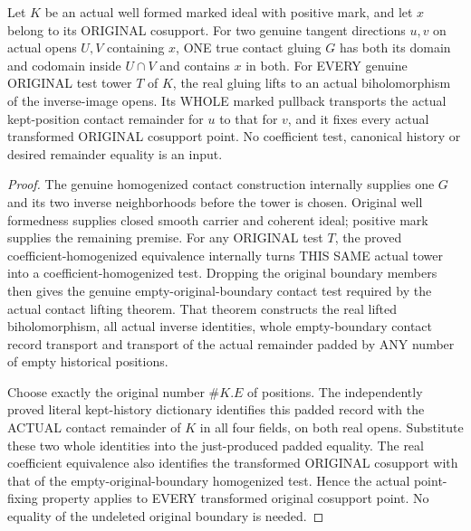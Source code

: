 \begin{theorem}
\label{hir:original-any-test-independent-contact-whole-remainder}
\leanok
Let $K$ be an actual well formed marked ideal with positive mark, and let
$x$ belong to its ORIGINAL cosupport. For two genuine tangent directions
$u,v$ on actual opens $U,V$ containing $x$, ONE true contact gluing $G$
has both its domain and codomain inside $U\cap V$ and contains $x$ in both.
For EVERY genuine ORIGINAL test tower $T$ of $K$, the real gluing lifts to
an actual biholomorphism of the inverse-image opens. Its WHOLE marked
pullback transports the actual kept-position contact remainder for $u$
to that for $v$, and it fixes every actual transformed ORIGINAL cosupport
point. No coefficient test, canonical history or desired remainder equality
is an input.
\end{theorem}
\begin{proof}
The genuine homogenized contact construction internally supplies one $G$
and its two inverse neighborhoods before the tower is chosen. Original
well formedness supplies closed smooth carrier and coherent ideal; positive
mark supplies the remaining premise. For any ORIGINAL test $T$, the proved
coefficient-homogenized equivalence internally turns THIS SAME actual tower
into a coefficient-homogenized test. Dropping the original boundary members
then gives the genuine empty-original-boundary contact test required by the
actual contact lifting theorem. That theorem constructs the real lifted
biholomorphism, all actual inverse identities, whole empty-boundary contact
record transport and transport of the actual remainder padded by ANY
number of empty historical positions.

Choose exactly the original number $\#K.E$ of positions. The independently
proved literal kept-history dictionary identifies this padded record with
the ACTUAL contact remainder of $K$ in all four fields, on both real opens.
Substitute these two whole identities into the just-produced padded equality.
The real coefficient equivalence also identifies the transformed ORIGINAL
cosupport with that of the empty-original-boundary homogenized test. Hence
the actual point-fixing property applies to EVERY transformed original
cosupport point. No equality of the undeleted original boundary is needed.
\end{proof}

